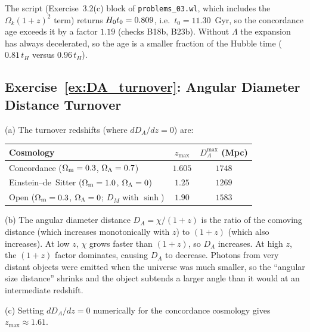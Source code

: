 \begin{annotation}
The script (Exercise~3.2(c) block of \texttt{problems\_03.wl}, which includes the
$\Omega_k(1+z)^2$ term) returns $H_0 t_0 = 0.809$, i.e.\
$t_0 = 11.30$~Gyr, so the concordance age exceeds it by a factor $1.19$
(checks B18b, B23b).  Without $\Lambda$ the expansion has always decelerated,
so the age is a smaller fraction of the Hubble time ($0.81\,t_H$ versus
$0.96\,t_H$).
\end{annotation}
\subsection*{Exercise~\ref{ex:DA_turnover}: Angular Diameter Distance Turnover}

(a) The turnover redshifts (where $dD_A/dz = 0$) are:
\begin{center}
\begin{tabular}{lcc}
\toprule
Cosmology & $z_{\max}$ & $D_A^{\max}$ (Mpc) \\
\midrule
Concordance ($\Omega_{\mathrm{m}} = 0.3$, $\Omega_{\Lambda} = 0.7$) & $1.605$ & $1748$ \\
Einstein--de~Sitter ($\Omega_{\mathrm{m}} = 1.0$, $\Omega_{\Lambda} = 0$) & $1.25$ & $1269$ \\
Open ($\Omega_{\mathrm{m}} = 0.3$, $\Omega_{\Lambda} = 0$; $D_M$ with $\sinh$) & $1.90$ & $1583$ \\
\bottomrule
\end{tabular}
\end{center}

(b) The angular diameter distance $D_A = \chi/(1+z)$ is the ratio
of the comoving distance (which increases monotonically with $z$) to
$(1+z)$ (which also increases).  At low $z$, $\chi$ grows faster than
$(1+z)$, so $D_A$ increases.  At high $z$, the $(1+z)$ factor dominates,
causing $D_A$ to decrease.  Photons from very distant objects
were emitted when the universe was much smaller, so the ``angular size
distance'' shrinks and the object subtends a larger angle than it would
at an intermediate redshift.

(c) Setting $dD_A/dz = 0$ numerically for the concordance
cosmology gives $z_{\max} \approx 1.61$.


